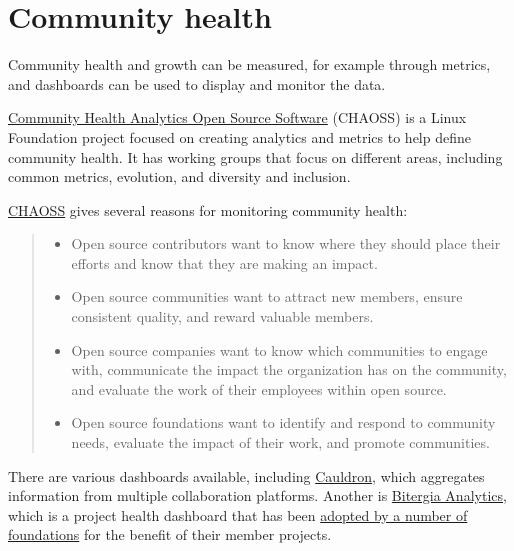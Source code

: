 


\chapter{Community health}

Community health and growth can be measured, for example through metrics, and dashboards can be used to display and monitor the data.

\href{https://chaoss.community/}{Community Health Analytics Open Source Software} (CHAOSS) is a Linux Foundation project focused on creating analytics and metrics to help define community health.  It has working groups that focus on different areas, including common metrics, evolution, and diversity and inclusion.

\begin{kaobox}[frametitle=CHAOSS: the importance of community health]

\href{https://chaoss.community/about/}{CHAOSS} gives several reasons for monitoring community health:

\begin{quote}

\begin{itemize}

\item Open source contributors want to know where they should place their efforts and know that they are making an impact.
\item Open source communities want to attract new members, ensure consistent quality, and reward valuable members.
\item Open source companies want to know which communities to engage with, communicate the impact the organization has on the community, and evaluate the work of their employees within open source.
\item Open source foundations want to identify and respond to community needs, evaluate the impact of their work, and promote communities.

\end{itemize}

\end{quote}

\end{kaobox}

There are various dashboards available, including \href{https://cauldron.io/}{Cauldron}, which aggregates information from multiple collaboration platforms.  Another is \href{https://bitergia.com/bitergia-analytics/}{Bitergia Analytics}, which is a project health dashboard that has been \href{https://bitergia.com/oss-foundations/}{adopted by a number of foundations} for the benefit of their member projects.

